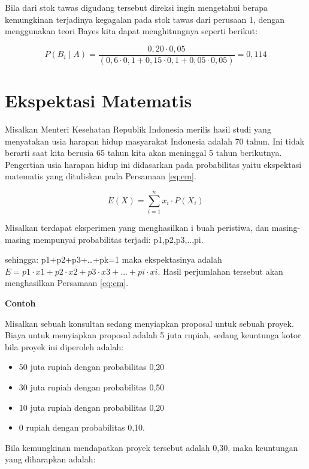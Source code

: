 \documentclass[]{book}
\providecommand{\tightlist}{%
  \setlength{\itemsep}{0pt}\setlength{\parskip}{0pt}}
\begin{document}
Bila dari stok tawas digudang tersebut direksi ingin mengetahui berapa
kemungkinan terjadinya kegagalan pada stok tawas dari perusaan 1, dengan
menggunakan teori Bayes kita dapat menghitungnya seperti berikut:

\[
P\left(B_i\mid A\right)=\frac{0,20\cdot0,05}{\left(0,6\cdot0,1+0,15\cdot0,1+0,05\cdot0,05\right)}=0,114
\]

\section{Ekspektasi Matematis}\label{ekspektasi-matematis}

Misalkan Menteri Kesehatan Republik Indonesia merilis hasil studi yang
menyatakan usia harapan hidup masyarakat Indonesia adalah 70 tahun. Ini
tidak berarti saat kita berusia 65 tahun kita akan meninggal 5 tahun
berikutnya. Pengertian usia harapan hidup ini didasarkan pada
probabilitas yaitu ekspektasi matematis yang dituliskan pada Persamaan
\eqref{eq:em}.

\begin{equation}
   E\left(X\right)=\sum_{i=1}^nx_i\cdot P\left(X_i\right)
  \label{eq:em}
\end{equation}

Misalkan terdapat eksperimen yang menghasilkan i buah peristiwa, dan
masing-masing mempunyai probabilitas terjadi: p1,p2,p3,..,pi.

sehingga: p1+p2+p3+\ldots{}+pk=1 maka ekspektasinya adalah
\(E=p1\cdot x1+p2\cdot x2+p3\cdot x3+...+pi\cdot xi\). Hasil perjumlahan
tersebut akan menghasilkan Persamaan \eqref{eq:em}.

\textbf{Contoh}

Misalkan sebuah konsultan sedang menyiapkan proposal untuk sebuah
proyek. Biaya untuk menyiapkan proposal adalah 5 juta rupiah, sedang
keuntunga kotor bila proyek ini diperoleh adalah:

\begin{itemize}
\tightlist
\item
  50 juta rupiah dengan probabilitas 0,20
\item
  30 juta rupiah dengan probabilitas 0,50
\item
  10 juta rupiah dengan probabilitas 0,20
\item
  0 rupiah dengan probabilitas 0,10.
\end{itemize}

Bila kemungkinan mendapatkan proyek tersebut adalah 0,30, maka
keuntungan yang diharapkan adalah:
\end{document}
